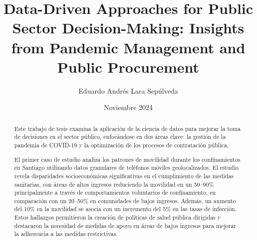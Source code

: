 \documentclass[upright, contnum]{umemoriaENG}
\author{Eduardo Andrés Lara Sepúlveda}
\title{Data-Driven Approaches for Public Sector Decision-Making: Insights from Pandemic Management and Public Procurement}
\date{Noviembre 2024}
\begin{document}
\frontmatter
\maketitle

\begin{abstract}





Este trabajo de tesis examina la aplicación de la ciencia de datos para mejorar la toma de decisiones en el sector público, enfocándose en dos áreas clave: la gestión de la pandemia de COVID-19 y la optimización de los procesos de contratación pública.

El primer caso de estudio analiza los patrones de movilidad durante los confinamientos en Santiago utilizando datos granulares de teléfonos móviles geolocalizados. El estudio revela disparidades socioeconómicas significativas en el cumplimiento de las medidas sanitarias, con áreas de altos ingresos reduciendo la movilidad en un 50–90\% principalmente a través de comportamientos voluntarios de confinamiento, en comparación con un 20–50\% en comunidades de bajos ingresos. Además, un aumento del 10\% en la movilidad se asocia con un incremento del 5\% en las tasas de infección. Estos hallazgos permitieron la creación de políticas de salud pública dirigidas y destacaron la necesidad de medidas de apoyo en áreas de bajos ingresos para mejorar la adherencia a las medidas restrictivas.


\end{abstract}
\end{document}
